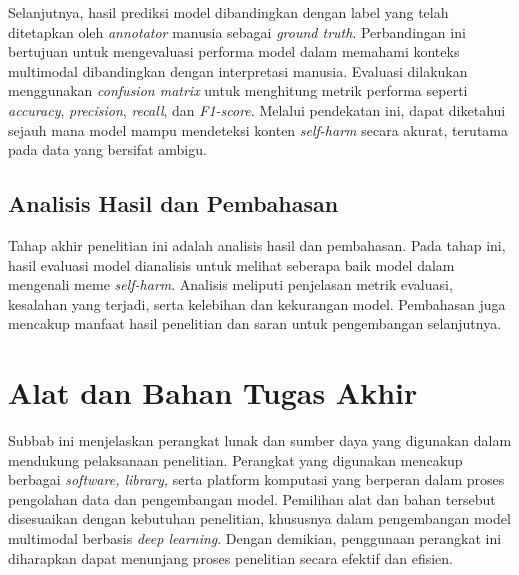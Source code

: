 Selanjutnya, hasil prediksi model dibandingkan dengan label yang telah ditetapkan oleh \textit{annotator} manusia sebagai \textit{ground truth}. Perbandingan ini bertujuan untuk mengevaluasi performa model dalam memahami konteks multimodal dibandingkan dengan interpretasi manusia. Evaluasi dilakukan menggunakan \textit{confusion matrix} untuk menghitung metrik performa seperti \textit{accuracy}, \textit{precision}, \textit{recall}, dan \textit{F1-score}. Melalui pendekatan ini, dapat diketahui sejauh mana model mampu mendeteksi konten \textit{self-harm} secara akurat, terutama pada data yang bersifat ambigu.

\subsection{Analisis Hasil dan Pembahasan} \label{subsec:analisis_hasil_dan_pembahasan}
Tahap akhir penelitian ini adalah analisis hasil dan pembahasan. Pada tahap ini, hasil evaluasi model dianalisis untuk melihat seberapa baik model dalam mengenali meme \textit{self-harm}. Analisis meliputi penjelasan metrik evaluasi, kesalahan yang terjadi, serta kelebihan dan kekurangan model. Pembahasan juga mencakup manfaat hasil penelitian dan saran untuk pengembangan selanjutnya. \par

\section{Alat dan Bahan Tugas Akhir} \label{sec:alat_dan_bahan_tugas_akhir}
Subbab ini menjelaskan perangkat lunak dan sumber daya yang digunakan dalam mendukung pelaksanaan penelitian. Perangkat yang digunakan mencakup berbagai \textit{software, library,} serta platform komputasi yang berperan dalam proses pengolahan data dan pengembangan model. Pemilihan alat dan bahan tersebut disesuaikan dengan kebutuhan penelitian, khususnya dalam pengembangan model multimodal berbasis \textit{deep learning}. Dengan demikian, penggunaan perangkat ini diharapkan dapat menunjang proses penelitian secara efektif dan efisien.

